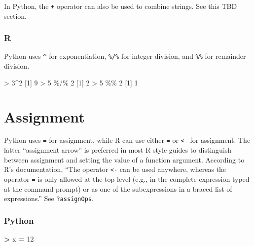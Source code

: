 \documentclass[
]{book}
\newenvironment{Shaded}{\begin{snugshade}}{\end{snugshade}}
\newcommand{\DecValTok}[1]{\textcolor[rgb]{0.00,0.00,0.81}{#1}}
\newcommand{\NormalTok}[1]{#1}
\newcommand{\OperatorTok}[1]{\textcolor[rgb]{0.81,0.36,0.00}{\textbf{#1}}}
\newcommand{\SpecialCharTok}[1]{\textcolor[rgb]{0.00,0.00,0.00}{#1}}
\begin{document}
In Python, the \texttt{+} operator can also be used to combine strings. See this TBD section.

\hypertarget{r}{%
\subsubsection*{R}\label{r}}

Python uses \texttt{\^{}} for exponentiation, \texttt{\%/\%} for integer division, and \texttt{\%\%} for remainder division.

\begin{Shaded}
\begin{Highlighting}[]
\SpecialCharTok{\textgreater{}} \DecValTok{3}\SpecialCharTok{\^{}}\DecValTok{2}
\NormalTok{[}\DecValTok{1}\NormalTok{] }\DecValTok{9}
\SpecialCharTok{\textgreater{}} \DecValTok{5} \SpecialCharTok{\%/\%} \DecValTok{2}
\NormalTok{[}\DecValTok{1}\NormalTok{] }\DecValTok{2}
\SpecialCharTok{\textgreater{}} \DecValTok{5} \SpecialCharTok{\%\%} \DecValTok{2}
\NormalTok{[}\DecValTok{1}\NormalTok{] }\DecValTok{1}
\end{Highlighting}
\end{Shaded}

\hypertarget{assignment}{%
\section{Assignment}\label{assignment}}

Python uses \texttt{=} for assignment, while R can use either \texttt{=} or \texttt{\textless{}-} for assignment. The latter ``assignment arrow'' is preferred in most R style guides to distinguish between assignment and setting the value of a function argument. According to R's documentation, ``The operator \texttt{\textless{}-} can be used anywhere, whereas the operator \texttt{=} is only allowed at the top level (e.g., in the complete expression typed at the command prompt) or as one of the subexpressions in a braced list of expressions.'' See \texttt{?assignOps}.

\hypertarget{python-1}{%
\subsubsection*{Python}\label{python-1}}

\begin{Shaded}
\begin{Highlighting}[]
\OperatorTok{\textgreater{}}\NormalTok{ x }\OperatorTok{=} \DecValTok{12}
\end{Highlighting}
\end{Shaded}
\end{document}
